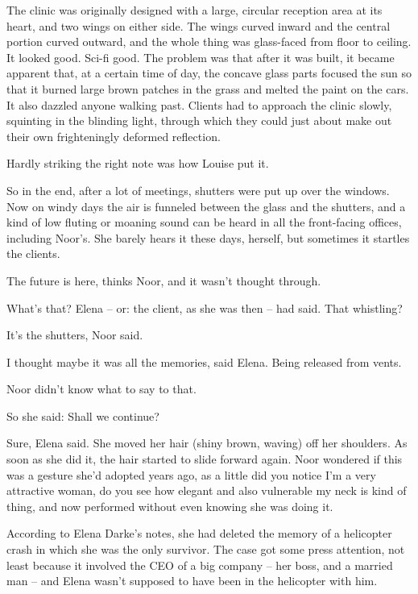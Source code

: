 \documentclass[12pt,a5paper]{book}
\newcommand{\storybreak}{%
  \par\vspace{0.6\baselineskip}
  \begin{center}\color{coveraccent}\small *\enspace *\enspace *\end{center}
  \vspace{0.3\baselineskip}\noindent\ignorespaces
}
\begin{document}
The clinic was originally designed with a large, circular reception area at its heart, and two wings on either side. The wings curved inward and the central portion curved outward, and the whole thing was glass-faced from floor to ceiling. It looked good. Sci-fi good. The problem was that after it was built, it became apparent that, at a certain time of day, the concave glass parts focused the sun so that it burned large brown patches in the grass and melted the paint on the cars. It also dazzled anyone walking past. Clients had to approach the clinic slowly, squinting in the blinding light, through which they could just about make out their own frighteningly deformed reflection.

Hardly striking the right note was how Louise put it.

So in the end, after a lot of meetings, shutters were put up over the windows. Now on windy days the air is funneled between the glass and the shutters, and a kind of low fluting or moaning sound can be heard in all the front-facing offices, including Noor's. She barely hears it these days, herself, but sometimes it startles the clients.

The future is here, thinks Noor, and it wasn't thought through.

\storybreak

What's that? Elena – or: the client, as she was then – had said. That whistling?

It's the shutters, Noor said.

I thought maybe it was all the memories, said Elena. Being released from vents.

Noor didn't know what to say to that.

So she said: Shall we continue?

Sure, Elena said. She moved her hair (shiny brown, waving) off her shoulders. As soon as she did it, the hair started to slide forward again. Noor wondered if this was a gesture she'd adopted years ago, as a little did you notice I'm a very attractive woman, do you see how elegant and also vulnerable my neck is kind of thing, and now performed without even knowing she was doing it.

According to Elena Darke's notes, she had deleted the memory of a helicopter crash in which she was the only survivor. The case got some press attention, not least because it involved the CEO of a big company – her boss, and a married man – and Elena wasn't supposed to have been in the helicopter with him.
\end{document}
